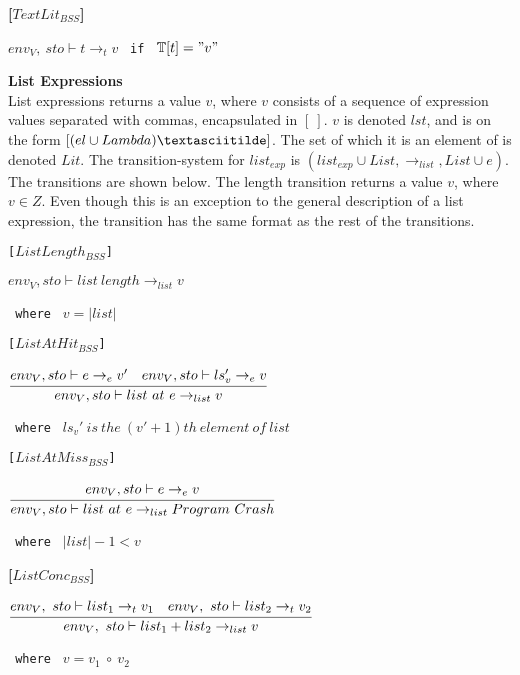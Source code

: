 \textbf{[$TextLit_{BSS}$]}
\begin{center}
	\begin{math}
	env_V,\ sto \vdash t \rightarrow_t v
	\end{math}
	\texttt{ if } $\mathbb{T}[t] = "v"$
\end{center}

\textbf{\Large{List Expressions}}\\
List expressions returns a value $v$, where $v$ consists of a sequence of expression values separated with commas, encapsulated in $[\ ]$.
$v$ is denoted $lst$, and is on the form $[(el \cup Lambda)\textasciitilde]$.
The set of which it is an element of is denoted $Lit$.
The transition-system for $list_{exp}$ is $(list_{exp} \cup List, \rightarrow_{list}, List \cup e)$.
The transitions are shown below.
The length transition returns a value $v$, where $v \in Z$.
Even though this is an exception to the general description of a list expression, the transition has the same format as the rest of the transitions.

\texttt{[$ListLength_{BSS}$]}
\begin{center}
	\begin{math}
			{env_V, sto \vdash list\ length \rightarrow_{list} v}
	\end{math}
	
	\texttt{ where } $v = |list|$
\end{center}

\texttt{[$ListAtHit_{BSS}$]}
\begin{center}
	\begin{math}
		\cfrac
			{env_V, sto \vdash e \rightarrow_{e} v' \quad env_V, sto \vdash ls_v' \rightarrow_e v}
			{env_V, sto \vdash list\ at\ e \rightarrow_{list} v}
	\end{math}
	
	\texttt{ where } $ls_v'\ is\ the\ (v' + 1)th\ element\ of\ list$
\end{center}

\texttt{[$ListAtMiss_{BSS}$]}
\begin{center}
	\begin{math}
		\cfrac
			{env_V, sto \vdash e \rightarrow_{e} v}
			{env_V, sto \vdash list\ at\ e \rightarrow_{list} Program\ Crash}
	\end{math}
	
	\texttt{ where } $|list| - 1 < v$
\end{center}


\textbf{[$ListConc_{BSS}$]}
\begin{center}
	\begin{math}
	\cfrac
	{env_V,\ sto \vdash list_1 \rightarrow_t v_1 \quad env_V,\ sto \vdash list_2 \rightarrow_t v_2}
	{env_V,\ sto \vdash list_1 + list_2 \rightarrow_{list} v}
	\end{math}
	
	\texttt{ where } $v = v_1\ \circ\ v_2$
\end{center}

